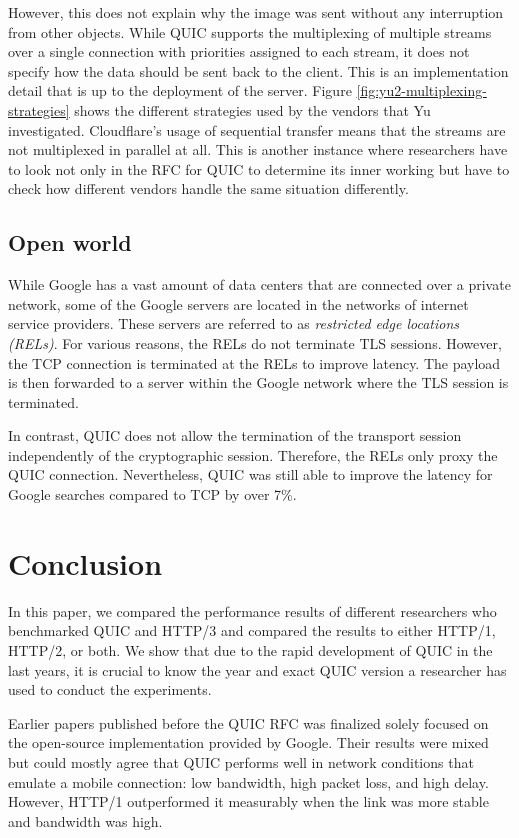 \documentclass[conference]{IEEEtran}
\begin{document}
However, this does not explain why the image was sent without any interruption from other objects. While QUIC supports the multiplexing of multiple streams over a single connection with priorities assigned to each stream, it does not specify how the data should be sent back to the client. This is an implementation detail that is up to the deployment of the server. Figure \ref{fig:yu2-multiplexing-strategies} shows the different strategies used by the vendors that Yu investigated. Cloudflare's usage of sequential transfer means that the streams are not multiplexed in parallel at all. This is another instance where researchers have to look not only in the RFC for QUIC to determine its inner working but have to check how different vendors handle the same situation differently.

\subsection{Open world}

While Google has a vast amount of data centers that are connected over a private network, some of the Google servers are located in the networks of internet service providers. These servers are referred to as \textit{restricted edge locations (RELs)}. For various reasons, the RELs do not terminate TLS sessions. However, the TCP connection is terminated at the RELs to improve latency. The payload is then forwarded to a server within the Google network where the TLS session is terminated. \cite{Google}

In contrast, QUIC does not allow the termination of the transport session independently of the cryptographic session. Therefore, the RELs only proxy the QUIC connection. Nevertheless, QUIC was still able to improve the latency for Google searches compared to TCP by over 7\%. 

\section{Conclusion}

In this paper, we compared the performance results of different researchers who benchmarked QUIC and HTTP/3 and compared the results to either HTTP/1, HTTP/2, or both. We show that due to the rapid development of QUIC in the last years, it is crucial to know the year and exact QUIC version a researcher has used to conduct the experiments.

Earlier papers published before the QUIC RFC was finalized solely focused on the open-source implementation provided by Google. Their results were mixed but could mostly agree that QUIC performs well in network conditions that emulate a mobile connection: low bandwidth, high packet loss, and high delay. However, HTTP/1 outperformed it measurably when the link was more stable and bandwidth was high.
\end{document}
